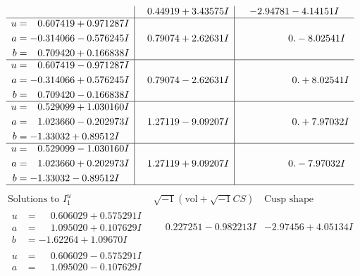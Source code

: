 \documentclass[1p]{elsarticle_modified}
\theoremstyle{definition}
\newcommand{\I}{\sqrt{-1}}
\begin{document}
$$\begin{array}{c|c|c}
 & \phantom{-}0.44919 + 3.43575 I & -2.94781 - 4.14151 I \\ \hline\begin{aligned}
u &= \phantom{-}0.607419 + 0.971287 I \\
a &= -0.314066 - 0.576245 I \\
b &= \phantom{-}0.709420 + 0.166838 I\end{aligned}
 & \phantom{-}0.79074 + 2.62631 I & \phantom{-0.000000 } 0. - 8.02541 I \\ \hline\begin{aligned}
u &= \phantom{-}0.607419 - 0.971287 I \\
a &= -0.314066 + 0.576245 I \\
b &= \phantom{-}0.709420 - 0.166838 I\end{aligned}
 & \phantom{-}0.79074 - 2.62631 I & \phantom{-0.000000 -}0. + 8.02541 I \\ \hline\begin{aligned}
u &= \phantom{-}0.529099 + 1.030160 I \\
a &= \phantom{-}1.023660 - 0.202973 I \\
b &= -1.33032 + 0.89512 I\end{aligned}
 & \phantom{-}1.27119 - 9.09207 I & \phantom{-0.000000 -}0. + 7.97032 I \\ \hline\begin{aligned}
u &= \phantom{-}0.529099 - 1.030160 I \\
a &= \phantom{-}1.023660 + 0.202973 I \\
b &= -1.33032 - 0.89512 I\end{aligned}
 & \phantom{-}1.27119 + 9.09207 I & \phantom{-0.000000 } 0. - 7.97032 I\\
 \hline 
 \end{array}$$\newpage$$\begin{array}{c|c|c}  
\text{Solutions to }I^u_{1}& \I (\text{vol} + \sqrt{-1}CS) & \text{Cusp shape}\\
 \hline 
\begin{aligned}
u &= \phantom{-}0.606029 + 0.575291 I \\
a &= \phantom{-}1.095020 + 0.107629 I \\
b &= -1.62264 + 1.09670 I\end{aligned}
 & \phantom{-}0.227251 - 0.982213 I & -2.97456 + 4.05134 I \\ \hline\begin{aligned}
u &= \phantom{-}0.606029 - 0.575291 I \\
a &= \phantom{-}1.095020 - 0.107629 I \\

\end{aligned}
\end{array}$$
\end{document}
